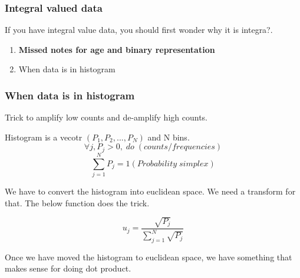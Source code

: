 \documentclass{article}
\begin{document}
\subsubsection*{Integral valued data}
If you have integral value data, you should first wonder why it is integra?.

\begin{enumerate}
	\item \textbf{Missed notes for age and binary representation}
	\item When data is in histogram
\end{enumerate}

\subsubsection*{When data is in histogram}
Trick to amplify low counts and de-amplify high counts.

Histogram is a vecotr \( (P_{1}, P_{2}, ... , P_{N}) \) and N bins.
\begin{equation*}
	\forall j, P_{j} > 0,\; do \; (counts/frequencies)
\end{equation*}
\begin{equation*}
	\sum_{j = 1}^{N} P_{j} = 1 (Probability \; simplex)
\end{equation*}

We have to convert the histogram into euclidean space.  We need a transform for that.  The below function does the trick.

\begin{equation*}
	u_{j} = \frac{\sqrt{P_{j}}}{\sum_{j=1}^{N} \sqrt{P_{j}} }
\end{equation*}

Once we have moved the histogram to euclidean space, we have something that makes sense for doing dot product.

\iffalse
\fi
\end{document}
